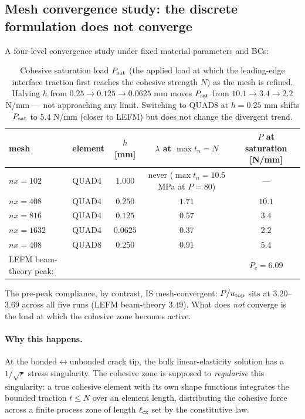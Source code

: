 \subsection{Mesh convergence study: the discrete formulation does not converge}
\label{subsec:mesh_conv}

A four-level convergence study under fixed material parameters and BCs:

\begin{table}[h]
\centering
\small
\begin{tabular}{llccc}
\toprule
mesh & element & $h$ [mm] & $\lambda$ at $\max t_n = N$ & $P$ at saturation [N/mm] \\
\midrule
$nx=102$  & QUAD4 & $1.000$  & never ($\max t_n = 10.5$ MPa at $P = 80$) & — \\
$nx=408$  & QUAD4 & $0.250$  & $1.71$ & $10.1$ \\
$nx=816$  & QUAD4 & $0.125$  & $0.57$ & $3.4$ \\
$nx=1632$ & QUAD4 & $0.0625$ & $0.37$ & $2.2$ \\
$nx=408$  & QUAD8 & $0.250$  & $0.91$ & $5.4$ \\
\midrule
LEFM beam-theory peak: & & & & $P_c = 6.09$ \\
\bottomrule
\end{tabular}
\caption{Cohesive saturation load $P_{\rm sat}$ (the applied load at which
the leading-edge interface traction first reaches the cohesive strength $N$)
as the mesh is refined. Halving $h$ from $0.25 \to 0.125 \to 0.0625$ mm
moves $P_{\rm sat}$ from $10.1 \to 3.4 \to 2.2$ N/mm — not approaching any
limit. Switching to QUAD8 at $h = 0.25$ mm shifts $P_{\rm sat}$ to $5.4$
N/mm (closer to LEFM) but does not change the divergent trend.}
\end{table}

The pre-peak compliance, by contrast, IS mesh-convergent: $P/u_{\rm top}$
sits at $3.20$–$3.69$ across all five runs (LEFM beam-theory $3.49$).
What does \emph{not} converge is the load at which the cohesive zone
becomes active.

\paragraph{Why this happens.}
At the bonded$\leftrightarrow$unbonded crack tip, the bulk linear-elasticity
solution has a $1/\sqrt{r}$ stress singularity. The cohesive zone is
supposed to \emph{regularise} this singularity: a true cohesive element
with its own shape functions integrates the bounded traction $t \le N$
over an element length, distributing the cohesive force across a finite
process zone of length $\ell_{\rm cz}$ set by the constitutive law.

